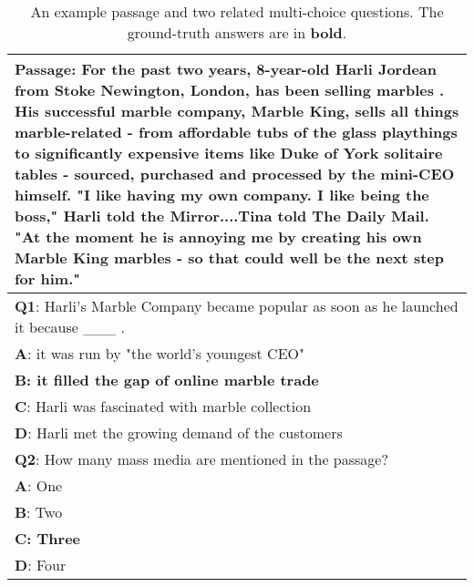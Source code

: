 \documentclass[11pt,a4paper]{article}
\begin{document}
\begin{table}[t!]
  \small
  \begin{center}
  \begin{tabular}{p{7.2cm}}
  \toprule
  \textbf{Passage}: For the past two years, 8-year-old Harli Jordean from Stoke Newington, London, has been selling marbles . His successful marble company, Marble King, sells all things marble-related - from affordable tubs of the glass playthings to significantly expensive items like Duke of York solitaire tables - sourced, purchased and processed by the mini-CEO himself. "I like having my own company. I like being the boss," Harli told the Mirror....Tina told The Daily Mail. "At the moment he is annoying me by creating his own Marble King marbles - so that could well be the next step for him." \\
  \midrule
\textbf{Q1}: Harli's Marble Company became popular as soon as he launched it because \_\_\_ .     \\
  \textbf{A}: it was run by "the world's youngest CEO"      \\
  \textbf{B: it filled the gap of online marble trade }     \\
  \textbf{C}: Harli was fascinated with marble collection   \\
  \textbf{D}: Harli met the growing demand of the customers \\
  \midrule
  \textbf{Q2}: How many mass media are mentioned in the passage?    \\
  \textbf{A}: One      \\
  \textbf{B}: Two     \\
  \textbf{C: Three}   \\
  \textbf{D}: Four \\
  \bottomrule
  \end{tabular}
  \end{center}
  \caption{An example passage and two related multi-choice questions. The ground-truth answers are in \textbf{bold}.}
  \label{tab:example}
\end{table}
\end{document}
